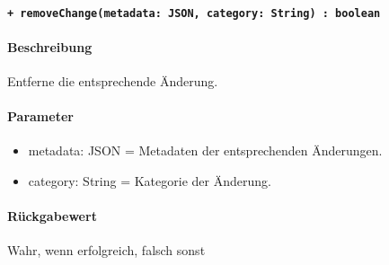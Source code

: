 \paragraph{\texttt{+ removeChange(metadata: JSON, category: String) : boolean}}%
\paragraph*{Beschreibung}
Entferne die entsprechende Änderung.
\paragraph*{Parameter}
\begin{itemize}
    \item metadata: JSON = Metadaten der entsprechenden Änderungen.
    \item category: String = Kategorie der Änderung.
\end{itemize}
\paragraph*{Rückgabewert}
Wahr, wenn erfolgreich, falsch sonst
